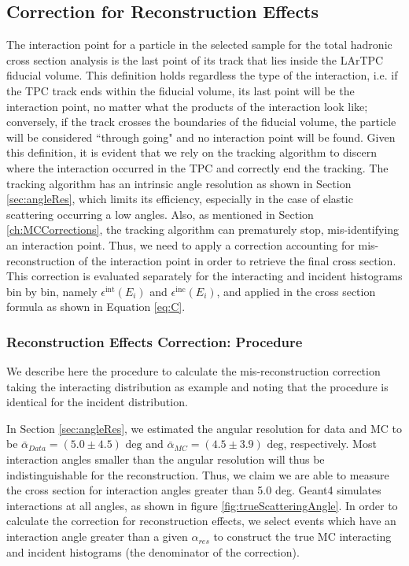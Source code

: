 \subsection{Correction for Reconstruction Effects}\label{ch:EFFXS}
The interaction point for a particle in the selected sample for the total hadronic cross section analysis is the last point of its track that lies inside the LArTPC fiducial volume. This definition holds regardless the type of the interaction, i.e. if the TPC track ends within the fiducial volume, its last point will be the interaction point, no matter what the products of the interaction look like; conversely, if the track crosses the boundaries of the fiducial volume, the particle will be considered ``through going" and no interaction point will be found.  Given this definition, it is evident that we rely on the tracking algorithm to discern where the interaction occurred in the TPC  and correctly end the tracking. The tracking algorithm has an intrinsic angle resolution as shown in Section \ref{sec:angleRes}, which limits its efficiency, especially in the case of elastic scattering occurring a low angles. Also, as mentioned in Section \ref{ch:MCCorrections}, the tracking algorithm can prematurely stop, mis-identifying an interaction point. 
Thus, we need to apply a correction accounting for mis-reconstruction of the interaction point in order to retrieve the final cross section.  This correction is evaluated separately for the interacting and incident histograms bin by bin, namely $\epsilon^{\text{int}}(E_i)$ and  $\epsilon^{\text{inc}}(E_i)$, and applied in the cross section formula as shown in  Equation \ref{eq:C}. 

\subsubsection{Reconstruction Effects Correction: Procedure}\label{sec:EffCorrection}
We describe here the procedure to calculate the mis-reconstruction correction taking the interacting distribution as example and noting that the procedure is identical for the incident distribution. 

In Section \ref{sec:angleRes}, we estimated the angular resolution for data and MC to be $\bar\alpha_{Data} = (5.0 \pm 4.5) \text{ deg}$  and 
$\bar\alpha_{MC} = (4.5 \pm 3.9) \text{ deg}$, respectively.  Most interaction angles smaller than the angular resolution will thus be indistinguishable  for the reconstruction. Thus, we claim we are able to  measure the cross section for interaction angles greater than 5.0 deg. Geant4 simulates interactions at all angles, as shown in figure \ref{fig:trueScatteringAngle}. In order to calculate the correction for reconstruction effects,  we select events which have an interaction angle greater than a given $\alpha_{res}$ to construct the true MC interacting and incident histograms (the denominator of the correction).

